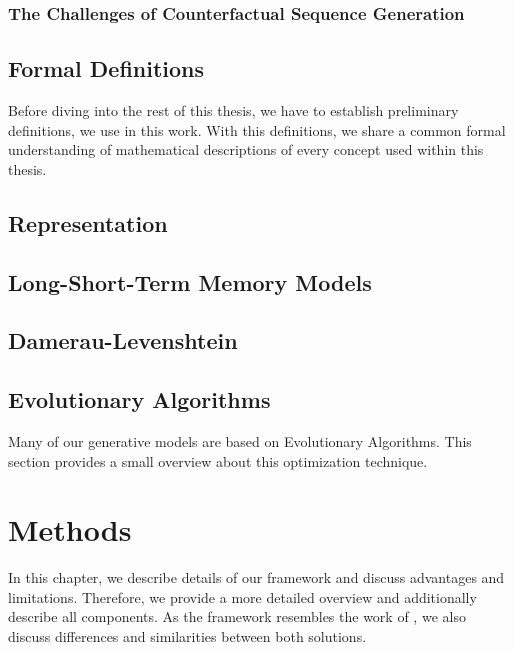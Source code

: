 \documentclass[12pt,a4paper]{report}
\begin{document}
\subsection{The Challenges of Counterfactual Sequence Generation}



\section{Formal Definitions}
\label{sec:formulas}
Before diving into the rest of this thesis, we have to establish preliminary definitions, we use in this work. With this definitions, we share a common formal understanding of mathematical descriptions of every concept used within this thesis. 


\section{Representation}
\label{sec:representation}


\section{Long-Short-Term Memory Models}
\label{sec:lstm}


\section{Damerau-Levenshtein}
\label{sec:damerau}


\section{Evolutionary Algorithms}
\label{sec:evo}
Many of our generative models are based on Evolutionary Algorithms. This section provides a small overview about this optimization technique.  



\chapter{Methods}
\label{ch:methods}
In this chapter, we describe details of our framework and discuss advantages and limitations. 
Therefore, we provide a more detailed overview and additionally describe all components. As the framework resembles the work of \citeauthor{hsieh_DiCE4ELInterpretingProcess_2021}, we also discuss differences and similarities between both solutions. 
\end{document}

